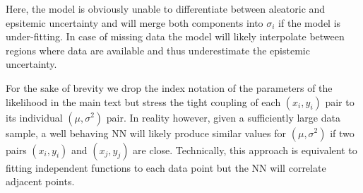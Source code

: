 \documentclass{article}
\begin{document}
Here, the model is obviously unable to differentiate between aleatoric and epsitemic uncertainty and will merge both components into $\sigma_i$ if the model is under-fitting.
In case of missing data the model will likely interpolate between regions where data are available and thus underestimate the epistemic uncertainty.

For the sake of brevity we drop the index notation of the parameters of the likelihood in the main text but stress the tight coupling of each $(x_i, y_i)$ pair to its individual $(\mu, \sigma^2)$ pair.
In reality however, given a sufficiently large data sample, a well behaving NN will likely produce similar values for $(\mu, \sigma^2)$ if two pairs $(x_i, y_i)$ and $(x_j, y_j)$ are close.
Technically, this approach is equivalent to fitting independent functions to each data point but the NN will correlate adjacent points.

\newpage
\end{document}
